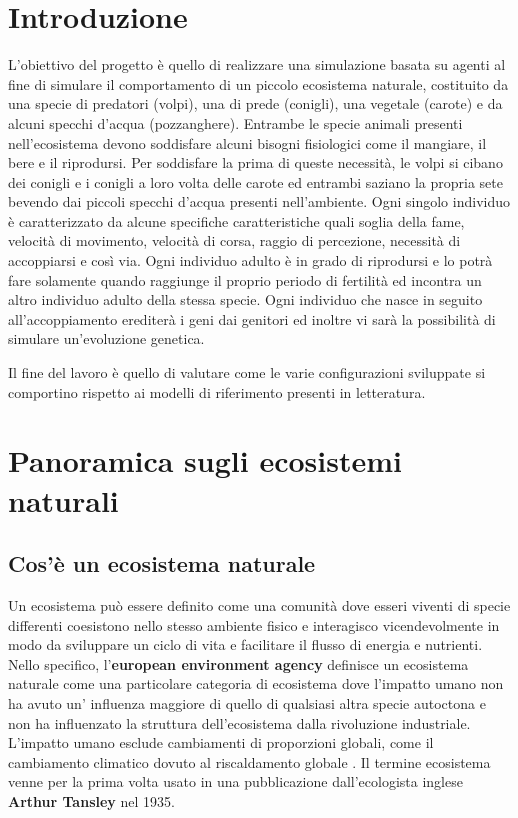 \documentclass[11pt]{article}
\begin{document}
\tableofcontents


\newpage

\section{Introduzione}
L'obiettivo del progetto è quello di realizzare una simulazione basata su agenti al fine di simulare il comportamento di un piccolo ecosistema naturale, costituito da una specie di predatori (volpi), una di prede (conigli), una vegetale (carote) e da alcuni specchi d'acqua (pozzanghere). Entrambe le specie animali presenti nell'ecosistema devono soddisfare alcuni bisogni fisiologici come il mangiare, il bere e il riprodursi. Per soddisfare la prima di queste necessità, le volpi si cibano dei conigli e i conigli a loro volta delle carote ed entrambi saziano la propria sete bevendo dai piccoli specchi d'acqua presenti nell'ambiente. Ogni singolo individuo è caratterizzato da alcune specifiche caratteristiche quali soglia della fame, velocità di movimento, velocità di corsa, raggio di percezione, necessità di accoppiarsi e così via. Ogni individuo adulto è in grado di riprodursi e lo potrà fare solamente quando raggiunge il proprio periodo di fertilità ed incontra un altro individuo adulto della stessa specie. Ogni individuo che nasce in seguito all'accoppiamento erediterà i geni dai genitori ed inoltre vi sarà la possibilità di simulare un'evoluzione genetica.

Il fine del lavoro è quello di valutare come le varie configurazioni sviluppate si comportino rispetto ai modelli di riferimento presenti in letteratura. 



\section{Panoramica sugli ecosistemi naturali}
\subsection{Cos'è un ecosistema naturale}
Un ecosistema\cite{Vedantu} può essere definito come una comunità dove esseri viventi di specie differenti coesistono nello stesso ambiente fisico e interagisco vicendevolmente in modo da sviluppare un ciclo di vita e facilitare il flusso di energia e nutrienti.
Nello specifico, l'\textbf{european environment agency} definisce un ecosistema naturale come una particolare categoria di ecosistema dove l'impatto umano non ha avuto un' influenza maggiore di quello di qualsiasi altra specie autoctona e non ha influenzato la struttura dell'ecosistema dalla rivoluzione industriale. L'impatto umano esclude cambiamenti di proporzioni globali, come il cambiamento climatico dovuto al riscaldamento globale \cite{EEA}.
Il termine ecosistema venne per la prima volta usato in una pubblicazione dall'ecologista inglese \textbf{Arthur Tansley} nel 1935\cite{WikiEcosystem}.
\end{document}
